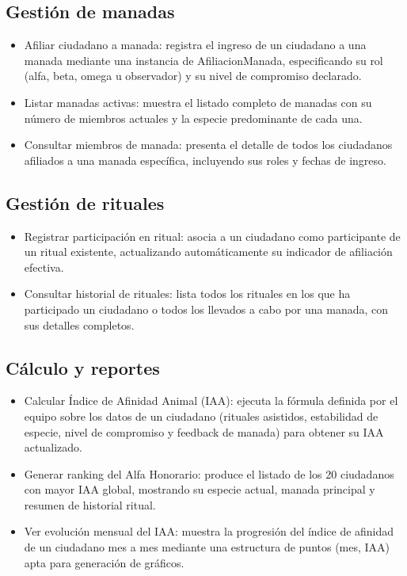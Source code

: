\documentclass[man]{apa7}
\begin{document}
	\subsection{Gestión de manadas}
		\begin{itemize}
			\item Afiliar ciudadano a manada: registra el ingreso de un ciudadano a una manada mediante una instancia de AfiliacionManada, especificando su rol (alfa, beta, omega u observador) y su nivel de compromiso declarado.
			\item Listar manadas activas: muestra el listado completo de manadas con su número de miembros actuales y la especie predominante de cada una.
			\item Consultar miembros de manada: presenta el detalle de todos los ciudadanos afiliados a una manada específica, incluyendo sus roles y fechas de ingreso.
		\end{itemize}
	\subsection{Gestión de rituales}
		\begin{itemize}
			\item Registrar participación en ritual: asocia a un ciudadano como participante de un ritual existente, actualizando automáticamente su indicador de afiliación efectiva.
			\item Consultar historial de rituales: lista todos los rituales en los que ha participado un ciudadano o todos los llevados a cabo por una manada, con sus detalles completos.
		
		\end{itemize}
	\subsection{Cálculo y reportes}
		\begin{itemize}
			\item Calcular Índice de Afinidad Animal (IAA): ejecuta la fórmula definida por el equipo sobre los datos de un ciudadano (rituales asistidos, estabilidad de especie, nivel de compromiso y feedback de manada) para obtener su IAA actualizado.
			\item Generar ranking del Alfa Honorario: produce el listado de los 20 ciudadanos con mayor IAA global, mostrando su especie actual, manada principal y resumen de historial ritual.
			\item Ver evolución mensual del IAA: muestra la progresión del índice de afinidad de un ciudadano mes a mes mediante una estructura de puntos (mes, IAA) apta para generación de gráficos.

		\end{itemize}
\end{document}
